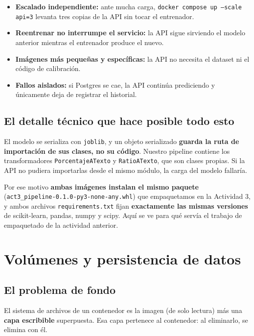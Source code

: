 \documentclass[12pt,a4paper]{article}
\begin{document}
\begin{itemize}
\item \textbf{Escalado independiente:} ante mucha carga, \texttt{docker compose up --scale api=3}
levanta tres copias de la API sin tocar el entrenador.
\item \textbf{Reentrenar no interrumpe el servicio:} la API sigue sirviendo el modelo anterior
mientras el entrenador produce el nuevo.
\item \textbf{Im\'agenes m\'as peque\~nas y espec\'ificas:} la API no necesita el dataset ni el
c\'odigo de calibraci\'on.
\item \textbf{Fallos aislados:} si Postgres se cae, la API contin\'ua prediciendo y \'unicamente
deja de registrar el historial.
\end{itemize}

\subsection{El detalle t\'ecnico que hace posible todo esto}

El modelo se serializa con \texttt{joblib}, y un objeto serializado \textbf{guarda la ruta de
importaci\'on de sus clases, no su c\'odigo}. Nuestro pipeline contiene los transformadores
\texttt{PorcentajeATexto} y \texttt{RatioATexto}, que son clases propias. Si la API no pudiera
importarlas desde el mismo m\'odulo, la carga del modelo fallar\'ia.

Por ese motivo \textbf{ambas im\'agenes instalan el mismo paquete}
(\texttt{act3\_pipeline-0.1.0-py3-none-any.whl}) que empaquetamos en la Actividad 3, y ambos
archivos \texttt{requirements.txt} fijan \textbf{exactamente las mismas versiones} de
scikit-learn, pandas, numpy y scipy. Aqu\'i se ve para qu\'e serv\'ia el trabajo de empaquetado de
la actividad anterior.

\section{Vol\'umenes y persistencia de datos}

\subsection{El problema de fondo}

El sistema de archivos de un contenedor es la imagen (de solo lectura) m\'as una \textbf{capa
escribible} superpuesta. Esa capa pertenece al contenedor: al eliminarlo, se elimina con \'el.
\end{document}
